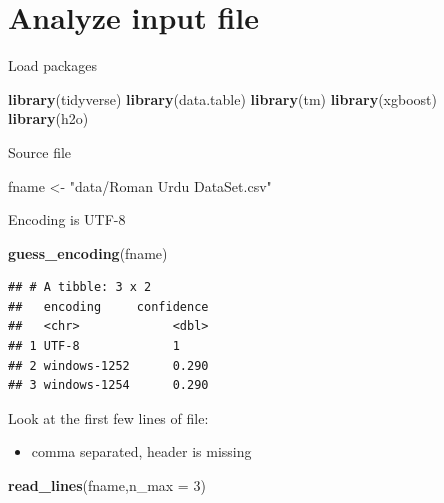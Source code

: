 \documentclass[
]{article}
\newenvironment{Shaded}{\begin{snugshade}}{\end{snugshade}}
\newcommand{\DataTypeTok}[1]{\textcolor[rgb]{0.13,0.29,0.53}{#1}}
\newcommand{\DecValTok}[1]{\textcolor[rgb]{0.00,0.00,0.81}{#1}}
\newcommand{\KeywordTok}[1]{\textcolor[rgb]{0.13,0.29,0.53}{\textbf{#1}}}
\newcommand{\NormalTok}[1]{#1}
\newcommand{\StringTok}[1]{\textcolor[rgb]{0.31,0.60,0.02}{#1}}
\providecommand{\tightlist}{%
  \setlength{\itemsep}{0pt}\setlength{\parskip}{0pt}}
\begin{document}
\hypertarget{analyze-input-file}{%
\section{Analyze input file}\label{analyze-input-file}}

Load packages

\begin{Shaded}
\begin{Highlighting}[]
\KeywordTok{library}\NormalTok{(tidyverse)}
\KeywordTok{library}\NormalTok{(data.table)}
\KeywordTok{library}\NormalTok{(tm)}
\KeywordTok{library}\NormalTok{(xgboost)}
\KeywordTok{library}\NormalTok{(h2o)}
\end{Highlighting}
\end{Shaded}

Source file

\begin{Shaded}
\begin{Highlighting}[]
\NormalTok{fname \textless{}{-}}\StringTok{ "data/Roman Urdu DataSet.csv"}
\end{Highlighting}
\end{Shaded}

Encoding is UTF-8

\begin{Shaded}
\begin{Highlighting}[]
\KeywordTok{guess\_encoding}\NormalTok{(fname)}
\end{Highlighting}
\end{Shaded}

\begin{verbatim}
## # A tibble: 3 x 2
##   encoding     confidence
##   <chr>             <dbl>
## 1 UTF-8             1    
## 2 windows-1252      0.290
## 3 windows-1254      0.290
\end{verbatim}

Look at the first few lines of file:

\begin{itemize}
\tightlist
\item
  comma separated, header is missing
\end{itemize}

\begin{Shaded}
\begin{Highlighting}[]
\KeywordTok{read\_lines}\NormalTok{(fname,}\DataTypeTok{n\_max =} \DecValTok{3}\NormalTok{)}
\end{Highlighting}
\end{Shaded}
\end{document}
